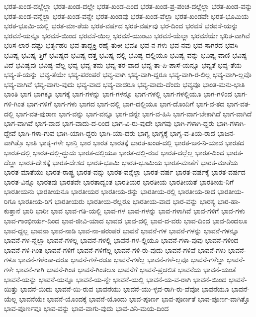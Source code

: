 {ಭರತ-ಖಂಡ-ದಲ್ಲೆಲ್ಲಾ
ಭರತ-ಖಂಡ-ದಲ್ಲೇ
ಭರತ-ಖಂಡ-ದಿಂದ
ಭರತ-ಖಂಡ-ಪ್ರ-ಪಂಚ-ದಲ್ಲೆಲ್ಲಾ
ಭರತ-ಖಂಡ-ವನ್ನು
ಭರತ-ಖಂಡ-ವನ್ನೆಲ್ಲಾ
ಭರತ-ಖಂಡ-ವನ್ನೇ
ಭರತ-ಖಂಡವು
ಭರತ-ಖಂಡ-ವೆಲ್ಲಾ
ಭರತ-ಖಂಡವೇ
ಭರತ-ಭೂಮಿಯ
ಭರತ-ಭೂಮಿ-ಯಲ್ಲಿ
ಭರತ-ಮಾ-ತೆಯ
ಭರತ-ವರ್ಷದ
ಭರತ-ವರ್ಷವು
ಭರ-ದಿಂದ
ಭರವಸೆ
ಭರವಸೆ-ಯನ್ನು
ಭರವಸೆ-ಯನ್ನೂ
ಭರವಸೆ-ಯಿಂದ
ಭರವಸೆ-ಯಿಲ್ಲ
ಭರವಸೆ-ಯುಂಟು
ಭರವಸೆ-ಯೆಲ್ಲಾ
ಭರವಸೆಯೇ
ಭರಿತ-ವಾಗಿವೆ
ಭರಿಸ-ಲಾರ-ದಷ್ಟು
ಭರ್ತೃಹರಿ
ಭವ-ತಾದ್ಭಕ್ತಿ-ರಹೈ-ತುಕೀ
ಭವತಿ
ಭವ-ನ-ಗಳು
ಭವ-ನವು
ಭವ-ಸಾಗರದ
ಭವಸಿ
ಭವಿಷ್ಯ
ಭವಿಷ್ಯ-ತ್ತಿಗೆ
ಭವಿಷ್ಯದ
ಭವಿಷ್ಯ-ದತ್ತ
ಭವಿಷ್ಯ-ದಲ್ಲಿ
ಭವಿಷ್ಯ-ದಲ್ಲಿಯೂ
ಭವಿಷ್ಯ-ವನ್ನು
ಭವಿಷ್ಯ-ವಾಣಿ
ಭವಿಷ್ಯ-ವಿದೆ
ಭವಿಷ್ಯವು
ಭವಿಷ್ಯ-ವೆಲ್ಲ
ಭವ್ಯ
ಭವ್ಯ-ತಮ
ಭವ್ಯ-ತರ-ವಾದ
ಭವ್ಯ-ತಾ-ಪಿ-ಪಾಸೆ-ಯನ್ನೂ
ಭವ್ಯತೆ
ಭವ್ಯ-ತೆಯ
ಭವ್ಯ-ತೆ-ಯನ್ನು
ಭವ್ಯ-ತೆಯೇ
ಭವ್ಯ-ಪರಂಪರೆ
ಭವ್ಯ-ವಾಗಿ
ಭವ್ಯ-ವಾಗಿ-ದ್ದರೂ
ಭವ್ಯ-ವಾಗಿ-ರ-ಲಿಲ್ಲ
ಭವ್ಯ-ವಾಗಿ-ಲ್ಲವೊ
ಭವ್ಯ-ವಾಗಿವೆ
ಭವ್ಯ-ವಾಗು-ವುದು
ಭವ್ಯ-ವಾದ
ಭವ್ಯ-ವಾದರೂ
ಭವ್ಯ-ವಾದು-ದೆಂದು
ಭವ್ಯವೂ
ಭಾಂತ-ಮನು-ಭಾತಿ
ಭಾಂತಿ
ಭಾಗ
ಭಾಗಕ್ಕೂ
ಭಾಗಕ್ಕೆ
ಭಾಗ-ಗಳನ್ನು
ಭಾಗ-ಗಳನ್ನೂ
ಭಾಗ-ಗಳಲ್ಲಿ
ಭಾಗ-ಗಳಲ್ಲಿಯೂ
ಭಾಗ-ಗಳಿಂದ
ಭಾಗ-ಗಳಿ-ಗಿಂತ
ಭಾಗ-ಗಳಿಗೆ
ಭಾಗ-ಗಳು
ಭಾಗದ
ಭಾಗ-ದಲ್ಲಿ
ಭಾಗ-ದಲ್ಲಿಯೂ
ಭಾಗ-ದೊಂದಿಗೆ
ಭಾಗ-ವ-ತದ
ಭಾಗ-ವತ-ದಲ್ಲಿ
ಭಾಗ-ವತ-ಪುರಾಣ
ಭಾಗ-ವನ್ನು
ಭಾಗ-ವನ್ನೂ
ಭಾಗ-ವನ್ನೇ
ಭಾಗ-ವ-ಹಿಸಿ
ಭಾಗ-ವಾಗ-ಬೇಕಾಗಿದೆ
ಭಾಗ-ವಾಗಿದೆ
ಭಾಗ-ವಾಗಿವೆ
ಭಾಗ-ವಾದ
ಭಾಗ-ವಾದು-ದ-ರಿಂದ
ಭಾಗ-ವಿ-ರು-ವುದೇ
ಭಾಗವು
ಭಾಗಿ-ಗಳಾಗಿ-ದ್ದರು
ಭಾಗಿ-ಗಳಾಗಿ-ದ್ದೇವೆ
ಭಾಗಿ-ಗಳಾ-ಗುವ
ಭಾಗಿ-ಯಾಗಿ-ದ್ದರು
ಭಾಗಿ-ಯಾ-ದರು
ಭಾಗ್ಯ
ಭಾಗ್ಯಕ್ಕೆ
ಭಾಗ್ಯ-ವ-ತಿಯ-ರಾದ
ಭಾಜನ-ವಾಗಿತ್ತೊ
ಭಾತಿ
ಭಾತೃ-ಗಳೇ
ಭಾನ್ತಿ
ಭಾರ
ಭಾರತ
ಭಾರತಕ್ಕೆ
ಭಾರತ-ಖಂಡ-ದಲ್ಲಿ
ಭಾರತ-ಜನ-ನಿ-ಯಾದ
ಭಾರತದ
ಭಾರತ-ದಲ್ಲಿ
ಭಾರತ-ದಲ್ಲಿ-ದ್ದುದು
ಭಾರತ-ದಲ್ಲಿಯೂ
ಭಾರತ-ದಲ್ಲಿ-ರುವ
ಭಾರತ-ದಲ್ಲೆಲ್ಲ
ಭಾರತ-ದಿಂದ
ಭಾರತ-ದೆಲ್ಲಾ
ಭಾರತ-ದೇಶಕ್ಕೆ
ಭಾರತ-ದೇಶದ
ಭಾರತ-ಭೂಮಿ
ಭಾರತ-ಭೂಮಿಯ
ಭಾರತ-ಮಾತೆಗೆ
ಭಾರತ-ಮಾತೆಯ
ಭಾರತ-ಮಾತೆಯು
ಭಾರತ-ರಾಷ್ಟ್ರ
ಭಾರತ-ವನ್ನು
ಭಾರತ-ವನ್ನೆಲ್ಲಾ
ಭಾರತ-ವರ್ಷ
ಭಾರತ-ವರ್ಷಕ್ಕೆ
ಭಾರತ-ವರ್ಷದ
ಭಾರತ-ವಿನ್ನೂ
ಭಾರತವು
ಭಾರತವೇ
ಭಾರತಾದ್ಯಂತ
ಭಾರತಿಯರ
ಭಾರತೀಯ
ಭಾರತೀಯತೆ
ಭಾರತೀಯ-ನಿಗೆ
ಭಾರತೀಯನು
ಭಾರತೀಯನೂ
ಭಾರತೀಯರ
ಭಾರತೀಯ-ರನ್ನು
ಭಾರತೀಯ-ರಲ್ಲಿ
ಭಾರತೀಯ-ರಾದ
ಭಾರತೀಯ-ರಿಗೂ
ಭಾರತೀಯ-ರಿಗೆ
ಭಾರತೀಯರು
ಭಾರತೀಯ-ರೆಲ್ಲರೂ
ಭಾರತೀಯ-ವಾದ
ಭಾರ-ವನ್ನು
ಭಾರಸ್ಯ
ಭಾರ-ಹಾ-ಕುತ್ತಾನೆ
ಭಾರಿ
ಭಾರೀ
ಭಾವ
ಭಾವ-ಗತಿ-ಯಲ್ಲಿ
ಭಾವ-ಗಳ
ಭಾವ-ಗಳನ್ನು
ಭಾವ-ಗಳಾಗಿವೆ
ಭಾವ-ಗಳಿಗೆ
ಭಾವ-ಗಳು
ಭಾವ-ಗಾಂಭೀರ್ಯ-ದಿಂದ
ಭಾವ-ಜೀವಿ-ಯಾದ
ಭಾವದ
ಭಾವ-ದಲ್ಲಿ
ಭಾವ-ದ-ವರು
ಭಾವ-ದಿಂದ
ಭಾವ-ದಿಂದಲೂ
ಭಾವ-ದ್ದಲ್ಲ
ಭಾವನಾ
ಭಾವ-ನಾಡಿ
ಭಾವ-ನಾ-ಪರಂಪರೆ
ಭಾವನೆ
ಭಾವನೆ-ಗಳ
ಭಾವನೆ-ಗಳನ್ನು
ಭಾವನೆ-ಗಳನ್ನೂ
ಭಾವನೆ-ಗಳ-ನ್ನೆಲ್ಲಾ
ಭಾವನೆ-ಗಳಲ್ಲ
ಭಾವನೆ-ಗಳಲ್ಲಿ
ಭಾವನೆ-ಗಳ-ಲ್ಲಿಯೂ
ಭಾವನೆ-ಗಳಾ-ವುವು
ಭಾವನೆ-ಗಳಿಂದ
ಭಾವನೆ-ಗಳಿ-ಗಿಂತ
ಭಾವನೆ-ಗಳಿಗೆ
ಭಾವನೆ-ಗಳಿಗೆಲ್ಲ
ಭಾವನೆ-ಗಳಿ-ರು-ವುದು
ಭಾವನೆ-ಗಳಿವೆ
ಭಾವನೆ-ಗಳು
ಭಾವನೆ-ಗಳೂ
ಭಾವನೆ-ಗಳೆಂತಾ-ದರೂ
ಭಾವನೆ-ಗಳೆ-ರಡೂ
ಭಾವನೆ-ಗಳೆಲ್ಲ
ಭಾವನೆ-ಗಳೆ-ಲ್ಲವೂ
ಭಾವನೆ-ಗಳೆಲ್ಲಾ
ಭಾವನೆ-ಗಳೇ
ಭಾವನೆ-ಗಾಗಿ
ಭಾವನೆ-ಗಿಂತ
ಭಾವನೆ-ಗಿಂತಲೂ
ಭಾವನೆಗೆ
ಭಾವನೆ-ಪ್ರಚಲಿತ
ಭಾವನೆಯ
ಭಾವನೆ-ಯಂತೆ
ಭಾವನೆ-ಯನ್ನು
ಭಾವನೆ-ಯನ್ನೂ
ಭಾವನೆ-ಯ-ನ್ನೇ
ಭಾವನೆ-ಯಲ್ಲಿ
ಭಾವನೆ-ಯ-ವ-ರಾಗಿ
ಭಾವನೆ-ಯಿಂದ
ಭಾವನೆ-ಯಿತ್ತು
ಭಾವನೆ-ಯಿದು
ಭಾವನೆ-ಯಿ-ರುವ
ಭಾವನೆಯು
ಭಾವನೆ-ಯು-ಳ್ಳವ-ರಾಗಿ-ರು-ವೆವೋ
ಭಾವನೆಯೂ
ಭಾವನೆ-ಯೆಲ್ಲ
ಭಾವನೆಯೇ
ಭಾವನೆ-ಯೊಂದಕ್ಕೆ
ಭಾವನೆ-ಯೊಂದು
ಭಾವ-ಪೂರ್ಣ
ಭಾವ-ಪೂರ್ಣತೆ
ಭಾವ-ಪೂರ್ಣ-ವಾಗಿತ್ತೊ
ಭಾವ-ಪೂರ್ಣವೂ
ಭಾವ-ವನ್ನು
ಭಾವ-ವಾಗು-ವುದು
ಭಾವ-ವಿನಿ-ಮಯ-ದಿಂದ
}
